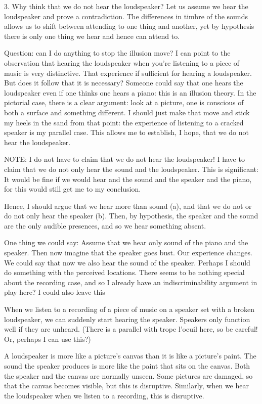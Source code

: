 \documentclass[sloppy, journal, git, bytitle, dodraft]{humapap}
\begin{document}
3. Why think that we do not hear the loudspeaker? Let us assume we hear the loudspeaker and prove a contradiction. The differences in timbre of the sounds allows us to shift between attending to one thing and another, yet by hypothesis there is only one thing we hear and hence can attend to. 

Question: can I do anything to stop the illusion move? I can point to the observation that hearing the loudspeaker when you're listening to a piece of music is very distinctive. That experience if sufficient for hearing a loudspeaker. But does it follow that it is necessary? Someone could say that one hears the loudspeaker even if one thinks one hears a piano: this is an illusion theory. In the pictorial case, there is a clear argument: look at a picture, one is conscious of both a surface and something different. I should just make that move and stick my heels in the sand from that point: the experience of listening to a cracked speaker is my parallel case. This allows me to establish, I hope, that we do not hear the loudspeaker. 

NOTE: I do not have to claim that we do not hear the loudspeaker! I have to claim that we do not only hear the sound and the loudspeaker. This is significant: It would be fine if we would hear and the sound and the speaker and the piano, for this would still get me to my conclusion. 

Hence, I should argue that we hear more than sound (a), and that we do not or do not only hear the speaker (b). Then, by hypothesis, the speaker and the sound are the only audible presences, and so we hear something absent. 

One thing we could say: Assume that we hear only sound of the piano and the speaker. Then now imagine that the speaker goes bust. Our experience changes. We could say that now we also hear the sound of the speaker. Perhaps I should do something with the perceived locations. There seems to be nothing special about the recording case, and so I already have an indiscriminability argument in play here? I could also leave this 

When we listen to a recording of a piece of music on a speaker set with a broken loudspeaker, we can suddenly start hearing the speaker. Speakers only function well if they are unheard. (There is a parallel with trope l'oeuil here, so be careful! Or, perhaps I can use this?) 

A loudspeaker is more like a picture's canvas than it is like a picture's paint. The sound the speaker produces is more like the paint that sits on the canvas. Both the speaker and the canvas are normally unseen. Some pictures are damaged, so that the canvas becomes visible, but this is disruptive. Similarly, when we hear the loudspeaker when we listen to a recording, this is disruptive. 
\end{document}
